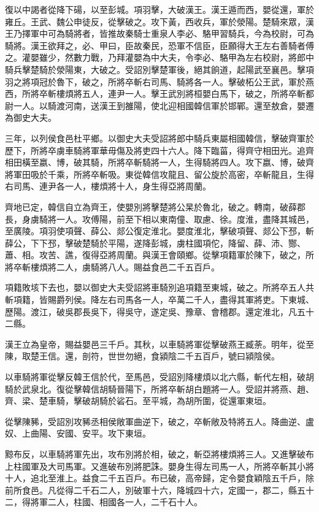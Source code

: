 復以中謁者從降下碭，以至彭城。項羽擊，大破漢王。漢王遁而西，嬰從還，軍於雍丘。王武、魏公申徒反，從擊破之。攻下黃，西收兵，軍於滎陽。楚騎來眾，漢王乃擇軍中可為騎將者，皆推故秦騎士重泉人李必、駱甲習騎兵，今為校尉，可為騎將。漢王欲拜之，必、甲曰，臣故秦民，恐軍不信臣，臣願得大王左右善騎者傅之。灌嬰雖少，然數力戰，乃拜灌嬰為中大夫，令李必、駱甲為左右校尉，將郎中騎兵擊楚騎於滎陽東，大破之。受詔別擊楚軍後，絕其餉道，起陽武至襄邑。擊項羽之將項冠於魯下，破之，所將卒斬右司馬、騎將各一人。擊破柘公王武，軍於燕西，所將卒斬樓煩將五人，連尹一人。擊王武別將桓嬰白馬下，破之，所將卒斬都尉一人。以騎渡河南，送漢王到雒陽，使北迎相國韓信軍於邯鄲。還至敖倉，嬰遷為御史大夫。

三年，以列侯食邑杜平鄉。以御史大夫受詔將郎中騎兵東屬相國韓信，擊破齊軍於歷下，所將卒虜車騎將軍華毋傷及將吏四十六人。降下臨菑，得齊守相田光。追齊相田橫至嬴、博，破其騎，所將卒斬騎將一人，生得騎將四人。攻下嬴、博，破齊將軍田吸於千乘，所將卒斬吸。東從韓信攻龍且、留公旋於高密，卒斬龍且，生得右司馬、連尹各一人，樓煩將十人，身生得亞將周蘭。

齊地已定，韓信自立為齊王，使嬰別將擊楚將公杲於魯北，破之。轉南，破薛郡長，身虜騎將一人。攻傅陽，前至下相以東南僮、取慮、徐。度淮，盡降其城邑，至廣陵。項羽使項聲、薛公、郯公復定淮北。嬰度淮北，擊破項聲、郯公下邳，斬薛公，下下邳，擊破楚騎於平陽，遂降彭城，虜柱國項佗，降留、薛、沛、酂、蕭、相。攻苦、譙，復得亞將周蘭。與漢王會頤鄉。從擊項籍軍於陳下，破之，所將卒斬樓煩將二人，虜騎將八人。賜益食邑二千五百戶。

項籍敗垓下去也，嬰以御史大夫受詔將車騎別追項籍至東城，破之。所將卒五人共斬項籍，皆賜爵列侯。降左右司馬各一人，卒萬二千人，盡得其軍將吏。下東城、歷陽。渡江，破吳郡長吳下，得吳守，遂定吳、豫章、會稽郡。還定淮北，凡五十二縣。

漢王立為皇帝，賜益嬰邑三千戶。其秋，以車騎將軍從擊破燕王臧荼。明年，從至陳，取楚王信。還，剖符，世世勿絕，食潁陰二千五百戶，號曰潁陰侯。

以車騎將軍從擊反韓王信於代，至馬邑，受詔別降樓煩以北六縣，斬代左相，破胡騎於武泉北。復從擊韓信胡騎晉陽下，所將卒斬胡白題將一人。受詔并將燕、趙、齊、梁、楚車騎，擊破胡騎於硰石。至平城，為胡所圍，從還軍東垣。

從擊陳豨，受詔別攻豨丞相侯敞軍曲逆下，破之，卒斬敞及特將五人。降曲逆、盧奴、上曲陽、安國、安平。攻下東垣。

黥布反，以車騎將軍先出，攻布別將於相，破之，斬亞將樓煩將三人。又進擊破布上柱國軍及大司馬軍。又進破布別將肥誅。嬰身生得左司馬一人，所將卒斬其小將十人，追北至淮上。益食二千五百戶。布已破，高帝歸，定令嬰食穎陰五千戶，除前所食邑。凡從得二千石二人，別破軍十六，降城四十六，定國一，郡二，縣五十二，得將軍二人，柱國、相國各一人，二千石十人。

